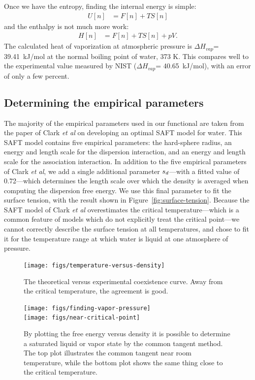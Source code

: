 \documentclass[letterpaper,twocolumn,amsmath,amssymb,prb]{revtex4-1}
\begin{document}
Once we have the entropy, finding the internal energy is simple:
\begin{align}
  U[n] &= F[n] + TS[n]
\end{align}
and the enthalpy is not much more work:
\begin{align}
  H[n] &= F[n] + TS[n] + pV.
\end{align}
The calculated heat of vaporization at atmospheric pressure is
$\Delta H_{vap}$= 39.41~kJ/mol at the normal boiling point of water,
373 K. This compares well to the experimental
value measured by NIST ($\Delta H_{vap}$= 40.65~kJ/mol\cite{nistwater}), with 
an error of only a few percent.

\subsection{Determining the empirical parameters}\label{sec:empirical}

The majority of the empirical parameters used in our functional are
taken from the paper of Clark \emph{et al} on developing an optimal
SAFT model for water\cite{clark2006developing}.  This SAFT model
contains five empirical parameters: the hard-sphere radius, an energy
and length scale for the dispersion interaction, and an energy and
length scale for the association interaction.  In addition to the five
empirical parameters of Clark \emph{et al}, we add a single additional
parameter $s_d$---with a fitted value of 0.72---which determines
the length scale over which the density is averaged when computing the
dispersion free energy.  We use this final parameter to fit the
surface tension, with the result shown in
Figure~\ref{fig:surface-tension}.  Because the SAFT model of Clark
\emph{et al} overestimates the critical temperature---which is a
common feature of models which do not explicitly treat the critical
point---we cannot correctly describe the surface tension at all
temperatures, and chose to fit it for the temperature range at which
water is liquid at one atmosphere of pressure.


\begin{figure}
\begin{center}
\texttt{[image: figs/temperature-versus-density]}
\end{center}
\caption{The theoretical versus experimental coexistence curve. Away from
the critical temperature, the agreement is good. }
\label{fig:temperature-vs-density}
\end{figure}

\begin{figure}
\begin{center}
\texttt{[image: figs/finding-vapor-pressure]}\\
\texttt{[image: figs/near-critical-point]}
\end{center}
\caption{By plotting the free energy versus density it is possible to
  determine a saturated liquid or vapor state by the common tangent
  method. The top plot illustrates the common tangent near room 
  temperature, while the bottom plot shows the same thing close to the 
  critical temperature. }
\label{fig:homogeneous}
\end{figure}
\end{document}
